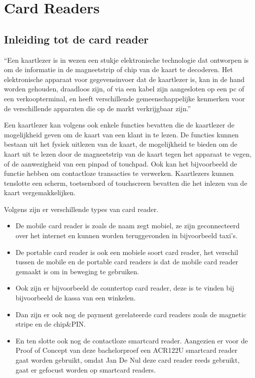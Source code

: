 \section{Card Readers}
\subsection{Inleiding tot de card reader}
``Een kaartlezer is in wezen een stukje elektronische technologie dat ontworpen is om de informatie in de magneetstrip of chip van de kaart te decoderen. Het elektronische apparaat voor gegevensinvoer dat de kaartlezer is, kan in de hand worden gehouden, draadloos zijn, of via een kabel zijn aangesloten op een pc of een verkoopterminal, en heeft verschillende gemeenschappelijke kenmerken voor de verschillende apparaten die op de markt verkrijgbaar zijn.''\autocite{MarinPenchevCardReader}

Een kaartlezer kan volgens \textcite{MarinPenchevCardReader} ook enkele functies bevatten die de kaartlezer de mogelijkheid geven om de kaart van een klant in te lezen. De functies kunnen bestaan uit het fysiek uitlezen van de kaart, de mogelijkheid te bieden om de kaart uit te lezen door de magneetstrip van de kaart tegen het apparaat te vegen, of de aanwezigheid van een pinpad of touchpad. Ook kan het bijvoorbeeld de functie hebben om contactloze transacties te verwerken. Kaartlezers kunnen tenslotte een scherm, toetsenbord of touchscreen bevatten die het inlezen van de kaart vergemakkelijken.

Volgens \textcite{MarinPenchevCardReader} zijn er verschillende types van card reader. 
\begin{itemize}
    \item De mobile card reader is zoals de naam zegt mobiel, ze zijn geconnecteerd over het internet en kunnen worden teruggevonden in bijvoorbeeld taxi's.
    \item De portable card reader is ook een mobiele soort card reader, het verschil tussen de mobile en de portable card readers is dat de mobile card reader gemaakt is om in beweging te gebruiken.
    \item Ook zijn er bijvoorbeeld de countertop card reader, deze is te vinden bij bijvoorbeeld de kassa van een winkelen.
    \item Dan zijn er ook nog de payment gerelateerde card readers zoals de magnetic stripe en de chip\&PIN.
    \item En ten slotte ook nog de contactloze smartcard reader. Aangezien er voor de Proof of Concept van deze bachelorproef een ACR122U smartcard reader gaat worden gebruikt, omdat Jan De Nul deze card reader reeds gebruikt, gaat er gefocust worden op smartcard readers.
\end{itemize}





